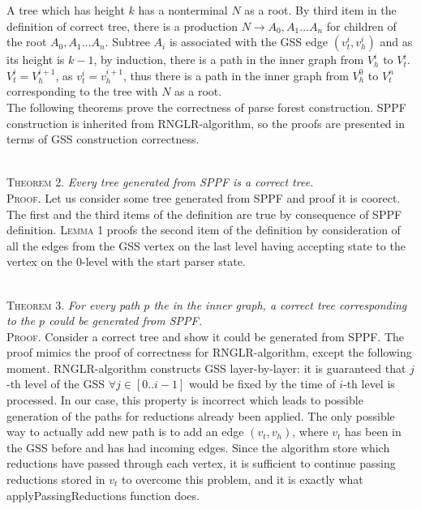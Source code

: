 A tree which has height $k$ has a nonterminal $N$ as a root. By third item in the definition of correct tree, 
there is a production $N \rightarrow A_{0}, A_{1} \dots A_{n}$ for children of the root $A_{0}, A_{1} \dots A_{n}$. 
Subtree $A_{i}$ is associated with the GSS edge $(v_{t}^{i}, v_{h}^{i})$ and as its height is $k-1$, by induction,
there is a path in the inner graph from $V_{h}^{i}$ to $V_{t}^{i}$. $V_{t}^i = V_{h}^{i+1}$, as $v_{t}^i = v_{h}^{i+1}$, 
thus there is a path in the inner graph from $V_{h}^{0}$ to $V_{t}^{n}$ corresponding to the tree with $N$ as a root.
~\\

The following theorems prove the correctness of parse forest construction. SPPF construction is inherited from 
RNGLR-algorithm, so the proofs are presented in terms of GSS construction correctness.

~\\
\textsc{Theorem 2.} 
\textit{Every tree generated from SPPF is a correct tree.}
~\\
\textsc{Proof.} Let us consider some tree generated from SPPF and proof it is coorect. 
The first and the third items of the definition are true by consequence of SPPF definition.
\textsc{Lemma 1} proofs the second item of the definition by consideration of all the edges from the GSS vertex
on the last level having accepting state to the vertex on the 0-level with the start parser state.

~\\
\textsc{Theorem 3.} 
\textit{For every path $p$ the in the inner graph, a correct tree corresponding to the $p$ could be generated from SPPF.}
~\\
\textsc{Proof.}
Consider a correct tree and show it could be generated from SPPF. The proof mimics the proof of correctness for RNGLR-algorithm,
except the following moment. RNGLR-algorithm constructs GSS layer-by-layer: it is guaranteed that $j$-th level of the GSS 
$\forall j \in [0..i-1]$ would be fixed by the time of $i$-th level is processed. In our case, this property is incorrect 
which leads to possible generation of the paths for reductions already been applied. The only possible way to actually 
add new path is to add an edge $(v_{t}, v_{h})$, where $v_{t}$ has been in the GSS before and has had incoming edges.
Since the algorithm store which reductions have passed through each vertex, it is sufficient to continue passing 
reductions stored in $v_{t}$ to overcome this problem, and it is exactly what applyPassingReductions function does. 